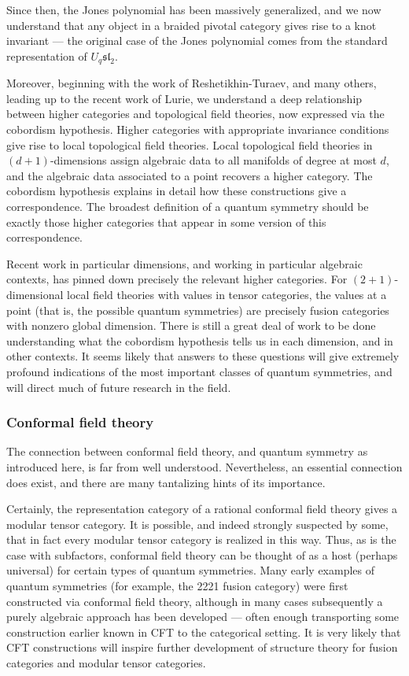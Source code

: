 \documentclass[11pt]{article}
\begin{document}
Since then, the Jones polynomial has been massively generalized, and we now understand that any object in a braided pivotal category  gives rise to a knot invariant --- the original case of the Jones polynomial comes from the standard representation of $U_q \mathfrak{sl}_2$.

Moreover, beginning with the work of Reshetikhin-Turaev, and many others, leading up to the recent work of Lurie, we understand a deep relationship between higher categories and  topological field theories, now expressed via the cobordism hypothesis. Higher categories with appropriate invariance conditions give rise to local topological field theories. Local topological field theories in $(d+1)$-dimensions assign algebraic data to all manifolds of degree at most $d$, and the algebraic data associated to a point recovers a higher category. The cobordism hypothesis explains in detail how these constructions give a correspondence. The broadest definition of a quantum symmetry should be exactly those higher categories that appear in some version of this correspondence.

Recent work in particular dimensions, and working in particular algebraic contexts, has pinned down precisely the relevant higher categories. For $(2+1)$-dimensional local field theories with values in tensor categories, the values at a point (that is, the possible quantum symmetries) are precisely fusion categories with nonzero global dimension. There is still a great deal of work
to be done understanding what the cobordism hypothesis tells us in each dimension, and in other contexts. It seems likely that answers to these questions will give extremely profound indications of the most important classes of quantum symmetries, and will direct much of future research in the field.

\subsubsection{Conformal field theory}

The connection between conformal field theory, and quantum symmetry as introduced here, is far from well understood. Nevertheless, an essential connection does exist, and there are many tantalizing hints of its importance.

Certainly, the representation category of a rational conformal field theory gives a modular tensor category. It is possible, and indeed strongly suspected by some, that in fact every modular tensor category is realized in this way.
Thus, as is the case with subfactors, conformal field theory can be thought of
as a host (perhaps universal) for certain types of quantum symmetries. Many early examples of quantum symmetries (for example, the 2221 fusion category) were first constructed via conformal field theory, although in many cases subsequently a purely algebraic approach has been developed --- often enough
transporting some construction earlier known in CFT to the categorical
setting. It is very likely that CFT constructions will inspire further
development of structure theory for fusion categories and modular tensor
categories.
\end{document}
